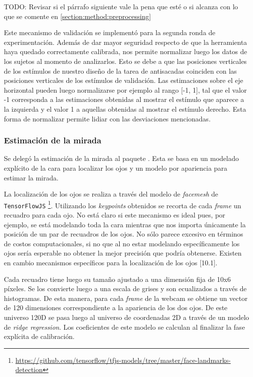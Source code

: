 TODO: Revisar si el párrafo siguiente vale la pena que esté o si alcanza con lo
que se comente en \ref{section:method:preprocessing}

Este mecanismo de validación se implementó para la segunda ronda de
experimentación.
Además de dar mayor seguridad respecto de que la herramienta haya quedado
correctamente calibrada, nos permite normalizar luego los datos de los sujetos
al momento de analizarlos.
Esto se debe a que las posiciones verticales de los estímulos de nuestro diseño
de la tarea de antisacadas coinciden con las posiciones verticales de los
estímulos de validación.
Las estimaciones sobre el eje horizontal pueden luego normalizarse por ejemplo
al rango [-1, 1], tal que el valor -1 corresponda a las estimaciones obtenidas
al mostrar el estímulo que aparece a la izquierda y el valor 1 a aquellas
obtenidas al mostrar el estímulo derecho.
Esta forma de normalizar permite lidiar con las desviaciones mencionadas.

\subsubsection{Estimación de la mirada}

Se delegó la estimación de la mirada al paquete \webgazer [10.4].
Esta se basa en un modelado explícito de la cara para localizar los ojos y un
modelo por apariencia para estimar la mirada.

La localización de los ojos se realiza a través del modelo de \textit{facemesh}
de \texttt{TensorFlowJS}
\footnote{\url{https://github.com/tensorflow/tfjs-models/tree/master/face-landmarks-detection}}.
Utilizando los \textit{keypoints} obtenidos se recorta de cada \textit{frame}
un recuadro para cada ojo.
No está claro si este mecanismo es ideal pues, por ejemplo, se está modelando
toda la cara mientras que nos importa únicamente la posición de un par de
recuadros de los ojos.
No sólo parece excesivo en términos de costos computacionales, si no que al no
estar modelando específicamente los ojos sería esperable no obtener la mejor
precisión que podría obtenerse.
Existen en cambio mecanismos específicos para la localización de los ojos
[10.1].

Cada recuadro tiene luego su tamaño ajustado a una dimensión fija de 10x6
píxeles.
Se los convierte luego a una escala de grises y son ecualizados a través de
histogramas.
De esta manera, para cada \textit{frame} de la webcam se obtiene un vector de
120 dimensiones correspondiente a la apariencia de los dos ojos.
De este universo 120D se pasa luego al universo de coordenadas 2D a través de
un modelo de \textit{ridge regression}.
Los coeficientes de este modelo se calculan al finalizar la fase explícita de
calibración.


